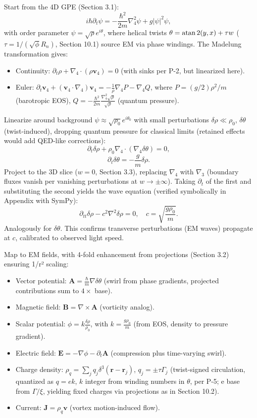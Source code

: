 \documentclass{article}
\begin{document}
Start from the 4D GPE (Section 3.1):
\[
i \hbar \partial_t \psi = -\frac{\hbar^2}{2 m} \nabla_4^2 \psi + g |\psi|^2 \psi,
\]
with order parameter \(\psi = \sqrt{\rho} e^{i \theta}\), where helical twists \(\theta = \atan2(y,x) + \tau w\) (\(\tau = 1 / (\sqrt{\phi} R_n)\), Section 10.1) source EM via phase windings. The Madelung transformation gives:
\begin{itemize}
  \item Continuity: \(\partial_t \rho + \nabla_4 \cdot (\rho \mathbf{v}_4) = 0\) (with sinks per P-2, but linearized here).
  \item Euler: \(\partial_t \mathbf{v}_4 + (\mathbf{v}_4 \cdot \nabla_4) \mathbf{v}_4 = -\frac{1}{\rho} \nabla_4 P - \nabla_4 Q\), where \(P = (g/2) \rho^2 / m\) (barotropic EOS), \(Q = -\frac{\hbar^2}{2 m} \frac{\nabla_4^2 \sqrt{\rho}}{\sqrt{\rho}}\) (quantum pressure).
\end{itemize}

Linearize around background \(\psi \approx \sqrt{\rho_0} e^{i \theta_0}\) with small perturbations \(\delta \rho \ll \rho_0\), \(\delta \theta\) (twist-induced), dropping quantum pressure for classical limits (retained effects would add QED-like corrections):
\[
\partial_t \delta \rho + \rho_0 \nabla_4 \cdot (\nabla_4 \delta \theta) = 0,
\]
\[
\partial_t \delta \theta = -\frac{g}{m} \delta \rho.
\]
Project to the 3D slice (\(w=0\), Section 3.3), replacing \(\nabla_4\) with \(\nabla_3\) (boundary fluxes vanish per vanishing perturbations at \(w \to \pm \infty\)). Taking \(\partial_t\) of the first and substituting the second yields the wave equation (verified symbolically in Appendix with SymPy):
\[
\partial_{tt} \delta \rho - c^2 \nabla^2 \delta \rho = 0, \quad c = \sqrt{\frac{g \rho_0}{m}}.
\]
Analogously for \(\delta \theta\). This confirms transverse perturbations (EM waves) propagate at \(c\), calibrated to observed light speed.

Map to EM fields, with 4-fold enhancement from projections (Section 3.2) ensuring 1/r² scaling:
\begin{itemize}
  \item Vector potential: \(\mathbf{A} = \frac{\hbar}{m} \nabla \delta \theta\) (swirl from phase gradients, projected contributions sum to \(4 \times\) base).
  \item Magnetic field: \(\mathbf{B} = \nabla \times \mathbf{A}\) (vorticity analog).
  \item Scalar potential: \(\phi = k \frac{\delta \rho}{\rho_0}\), with \(k = \frac{g \rho_0}{m}\) (from EOS, density to pressure gradient).
  \item Electric field: \(\mathbf{E} = -\nabla \phi - \partial_t \mathbf{A}\) (compression plus time-varying swirl).
  \item Charge density: \(\rho_q = \sum_j q_j \delta^3(\mathbf{r} - \mathbf{r}_j)\), \(q_j = \pm \tau \Gamma_j\) (twist-signed circulation, quantized as \(q = e k\), \(k\) integer from winding numbers in \(\theta\), per P-5; e base from \(\Gamma / \xi\), yielding fixed charges via projections as in Section 10.2).
  \item Current: \(\mathbf{J} = \rho_q \mathbf{v}\) (vortex motion-induced flow).
\end{itemize}
\end{document}
